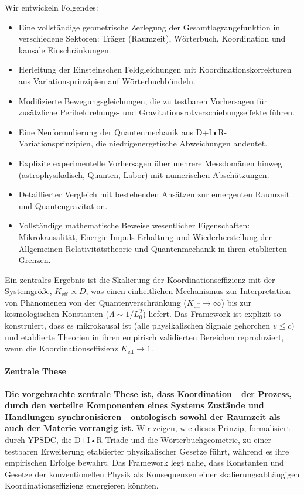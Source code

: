\documentclass[11pt,a4paper]{article}
\begin{document}
	Wir entwickeln Folgendes:
	\begin{itemize}
		\item Eine vollständige geometrische Zerlegung der Gesamtlagrangefunktion in verschiedene Sektoren: Träger (Raumzeit), Wörterbuch, Koordination und kausale Einschränkungen.
		\item Herleitung der Einsteinschen Feldgleichungen mit Koordinationskorrekturen aus Variationsprinzipien auf Wörterbuchbündeln.
		\item Modifizierte Bewegungsgleichungen, die zu testbaren Vorhersagen für zusätzliche Periheldrehungs- und Gravitationsrotverschiebungseffekte führen.
		\item Eine Neuformulierung der Quantenmechanik aus D+I•R-Variationsprinzipien, die niedrigenergetische Abweichungen andeutet.
		\item Explizite experimentelle Vorhersagen über mehrere Messdomänen hinweg (astrophysikalisch, Quanten, Labor) mit numerischen Abschätzungen.
		\item Detaillierter Vergleich mit bestehenden Ansätzen zur emergenten Raumzeit und Quantengravitation.
		\item Vollständige mathematische Beweise wesentlicher Eigenschaften: Mikrokausalität, Energie-Impuls-Erhaltung und Wiederherstellung der Allgemeinen Relativitätstheorie und Quantenmechanik in ihren etablierten Grenzen.
	\end{itemize}
	
	Ein zentrales Ergebnis ist die Skalierung der Koordinationseffizienz mit der Systemgröße, \(K_{\mathrm{eff}} \propto D\), was einen einheitlichen Mechanismus zur Interpretation von Phänomenen von der Quantenverschränkung (\(K_{\mathrm{eff}} \to \infty\)) bis zur kosmologischen Konstanten (\(\Lambda \sim 1/L_0^2\)) liefert. Das Framework ist explizit so konstruiert, dass es mikrokausal ist (alle physikalischen Signale gehorchen \(v \leq c\)) und etablierte Theorien in ihren empirisch validierten Bereichen reproduziert, wenn die Koordinationseffizienz \(K_{\mathrm{eff}} \to 1\).
	
	\paragraph{Zentrale These}
	\textbf{Die vorgebrachte zentrale These ist, dass Koordination—der Prozess, durch den verteilte Komponenten eines Systems Zustände und Handlungen synchronisieren—ontologisch sowohl der Raumzeit als auch der Materie vorrangig ist.} Wir zeigen, wie dieses Prinzip, formalisiert durch YPSDC, die D+I•R-Triade und die Wörterbuchgeometrie, zu einer testbaren Erweiterung etablierter physikalischer Gesetze führt, während es ihre empirischen Erfolge bewahrt. Das Framework legt nahe, dass Konstanten und Gesetze der konventionellen Physik als Konsequenzen einer skalierungsabhängigen Koordinationseffizienz emergieren könnten.
	
\end{document}
